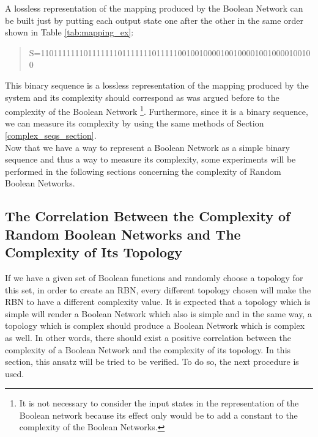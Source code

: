 A lossless representation of the mapping produced by the Boolean Network can be built just by putting each output state one after the other in the same order shown in Table \ref{tab:mapping_ex}:

\begin{quote}
\centering
S=1101111111011111110111111101111100100100001001000010010000100100
\end{quote}


This binary sequence is a lossless representation of the mapping produced by the system and its complexity should correspond as was argued before to the complexity of the Boolean Network \footnote{It is not necessary to consider the input states in the representation of the Boolean network because its effect only would be to add a constant to the complexity of the Boolean Networks.}. Furthermore, since it is a binary sequence, we can measure its complexity by using the same methods of Section \ref{complex_seqs_section}.\\

Now that we have a way to represent a Boolean Network as a simple binary sequence and thus a way to measure its complexity, some experiments will be performed in the following sections concerning the complexity of Random Boolean Networks.

\subsection{The Correlation Between the Complexity of Random Boolean Networks and The Complexity of Its Topology}
\label{correlation_com_topology}
If we have a given set of Boolean functions and randomly choose a topology for this set, in order to create an RBN, every different topology chosen will make the RBN to have a different complexity value. It is expected that a topology which is simple will render a Boolean Network which also is simple and in the same way, a topology which is complex should produce a Boolean Network which is complex as well. In other words, there should exist a positive correlation between the complexity of a Boolean Network and the complexity of its topology. In this section, this ansatz will be tried to be verified. To do so, the next procedure is used.\\

